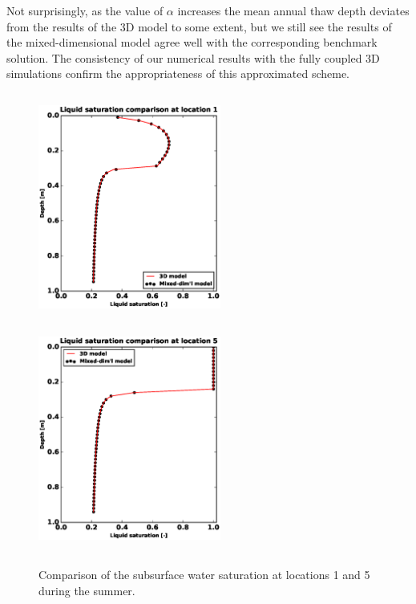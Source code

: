 \documentclass[review,11pt]{elsarticle}
\begin{document}
Not surprisingly, as the value of $\alpha$ increases the mean annual thaw depth deviates from the results of the 3D model to some extent, but we still see the results of the mixed-dimensional model agree well with the corresponding benchmark solution. The consistency of our numerical results with the fully coupled 3D simulations confirm the appropriateness of this approximated scheme. 






 \begin{figure}[!htpb]
\centering
\includegraphics[height = 7.5cm, width=6cm]{figures/comparison/regular/ss-sat/comp-sat-loc1-cycle0020.eps}
\includegraphics[height = 7.5cm, width=6cm]{figures/comparison/regular/ss-sat/comp-sat-loc5-cycle0020.eps}
\caption{Comparison of the subsurface water saturation at locations 1 and 5 during the summer.}
\label{ss-sat-comp}
\end{figure}
\end{document}
